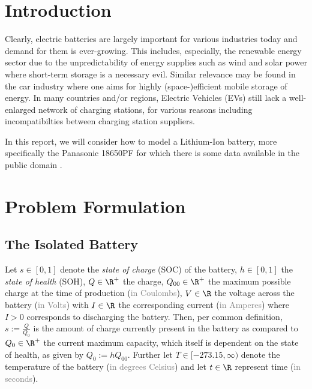 \documentclass{prettytex/ox/mmsc-special-topic}
\title{\topictitle}
\author{Candidate \candidatenumber}
\date{\today}
\begin{document}
  \pagestyle{plain}
  \mmscSpecialHeader[casestudy]

  \begin{abstract}
    \label{abstract}
    This work will attempt to

  \end{abstract}

  \tableofcontents

  \pagebreak
  \pagestyle{normal}

  \section{Introduction}
  Clearly, electric batteries are largely important for various industries today and demand for them is ever-growing.
  This includes, especially, the renewable energy sector due to the unpredictability of energy supplies such as wind and solar power where short-term storage is a necessary evil.
  Similar relevance may be found in the car industry where one aims for highly (space-)efficient mobile storage of energy.
  In many countries and/or regions, Electric Vehicles (EVs) still lack a well-enlarged network of charging stations, for various reasons including incompatibilties between charging station suppliers.

  In this report, we will consider how to model a Lithium-Ion battery, more specifically the Panasonic 18650PF for which there is some data available in the public domain \parencite{panasonicnums}.

  \section{Problem Formulation}
  \subsection{The Isolated Battery}
  Let
  $s \in [0, 1]$ denote the \textit{state of charge} (SOC) of the battery,
  $h \in [0, 1]$ the \textit{state of health} (SOH),
  $Q \in \R^+$ the charge,
  $Q_{00} \in \R^+$ the maximum possible charge at the time of production (\textcolor{gray}{in Coulombs}),
  $V \in \R$ the voltage across the battery (\textcolor{gray}{in Volts}) with
  $I \in \R$ the corresponding current (\textcolor{gray}{in Amperes}) where $I > 0$ corresponds to discharging the battery.
  Then, per common definition, $s := \frac{Q}{Q_0}$ is the amount of charge currently present in the battery as compared to $Q_0 \in \R^+$ the current maximum capacity, which itself is dependent on the state of health, as given by $Q_0 := h Q_{00}$.
  Further let
  $T \in [-273.15, \infty)$ denote the temperature of the battery (\textcolor{gray}{in degrees Celsius}) and
  let $t \in \R$ represent time (\textcolor{gray}{in seconds}).
\end{document}
